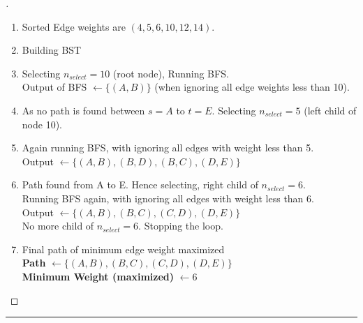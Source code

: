 \documentclass[a4paper, 12pt]{article}
\begin{document}
\begin{proof}[\color{red}{Solution}]
\begin{center}
\end{center}

\begin{enumerate}
    \item Sorted Edge weights are $(4, 5, 6, 10, 12, 14)$. 
    \item Building BST \\
    \begin{center}
    \end{center}
    \item Selecting $n_{select} = 10$ (root node), Running BFS. \\ Output of BFS $ \leftarrow\{(A, B)\}$ (when ignoring all edge weights less than 10). 
    \item As no path is found between $s = A$ to $t = E$. Selecting $n_{select} = 5$ (left child of node 10). 
    \item Again running BFS, with ignoring all edges with weight less than 5. \\ Output $ \leftarrow\{(A, B), (B, D), (B, C), (D, E)\}$
    \item Path found from A to E. Hence selecting, right child of $n_{select} = 6$.\\ Running BFS again, with ignoring all edges with weight less than 6. \\ Output $ \leftarrow\{(A, B), (B, C), (C, D), (D, E)\}$
    \\ No more child of $n_{select} = 6$. Stopping the loop. 
    \item Final path of minimum edge weight maximized\\
    \textbf{Path} $ \leftarrow\{(A, B), (B, C), (C, D), (D, E)\}$ \\
    \textbf{Minimum Weight (maximized)} $ \leftarrow 6$ 
\end{enumerate}
\end{proof}
\bigskip
\hrule
\bigskip
\end{document}
